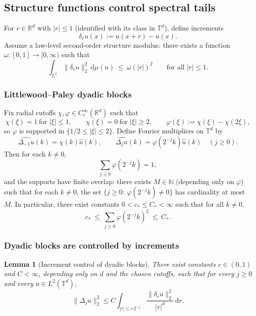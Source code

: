 \documentclass{article}
\numberwithin{equation}{section}
\theoremstyle{plain}
\newtheorem{lemma}[theorem]{Lemma}
\theoremstyle{definition}
\theoremstyle{remark}
\begin{document}
\subsection{Structure functions control spectral tails}

For $r\in\mathbb{R}^d$ with $|r|\le 1$ (identified with its class in $\mathbb{T}^d$), define increments
\[
\delta_r u(x):=u(x+r)-u(x).
\]
Assume a law-level second-order structure modulus: there exists a function
$\omega:[0,1]\to[0,\infty)$ such that
\begin{equation}\label{eq:omega-ass}
\int_{L^2}\|\delta_r u\|_2^2\,\mathrm{d}\mu(u)\ \le\ \omega(|r|)^2
\qquad\text{for all }|r|\le 1.
\end{equation}


\subsubsection{Littlewood--Paley dyadic blocks}
Fix radial cutoffs $\chi,\varphi\in C_c^\infty(\mathbb{R}^d)$ such that
\[
\chi(\xi)=1\ \text{for }|\xi|\le 1,\qquad \chi(\xi)=0\ \text{for }|\xi|\ge 2,
\qquad
\varphi(\xi):=\chi(\xi)-\chi(2\xi),
\]
so $\varphi$ is supported in $\{1/2\le|\xi|\le 2\}$.
Define Fourier multipliers on $\mathbb{T}^d$ by
\[
\widehat{\Delta_{-1}u}(k)=\chi(k)\widehat u(k),\qquad
\widehat{\Delta_j u}(k)=\varphi(2^{-j}k)\widehat u(k)\quad (j\ge 0).
\]
Then for each $k\neq 0$,
\[
\sum_{j\ge 0}\varphi(2^{-j}k)=1,
\]
and the supports have finite overlap: there exists $M\in\mathbb{N}$ (depending only on $\varphi$) such that
for each $k\neq 0$, the set $\{j\ge 0:\ \varphi(2^{-j}k)\neq 0\}$ has cardinality at most $M$.
In particular, there exist constants $0<c_*\le C_*<\infty$ such that for all $k\neq 0$,
\begin{equation}\label{eq:finite-overlap}
c_*\ \le\ \sum_{j\ge 0}\varphi(2^{-j}k)^2\ \le\ C_*.
\end{equation}

\subsubsection{Dyadic blocks are controlled by increments}

\begin{lemma}[Increment control of dyadic blocks]
\label{lem:inc-dyadic}
There exist constants $c\in(0,1)$ and $C<\infty$, depending only on $d$ and the chosen cutoffs,
such that for every $j\ge 0$ and every $u\in L^2(\mathbb{T}^d)$,
\[
\|\Delta_j u\|_2^2 \le
C\int_{|r|\le c\,2^{-j}}\frac{\|\delta_r u\|_2^2}{|r|^d}\,\mathrm{d}r.
\]
\end{lemma}
\end{document}
